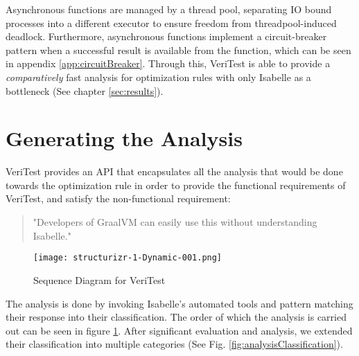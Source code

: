 Asynchronous functions are managed by a thread pool, separating IO bound processes into a different executor to ensure freedom from 
threadpool-induced deadlock. Furthermore, asynchronous functions implement a circuit-breaker pattern when a successful result is available 
from the function, which can be seen in appendix \ref{app:circuitBreaker}. Through this, VeriTest is able to provide a \emph{comparatively} 
fast analysis for optimization rules with only Isabelle as a bottleneck (See chapter \ref{sec:results}).

\section{Generating the Analysis}
\label{sec:generateAnalysis}

VeriTest provides an API that encapsulates all the analysis that would be done towards the optimization rule 
in order to provide the functional requirements of VeriTest, and satisfy the non-functional requirement:

\begin{quote}
    "Developers of GraalVM can easily use this without understanding Isabelle."
\end{quote}

\begin{figure}[!htb]
    \centering
    \texttt{[image: structurizr-1-Dynamic-001.png]}
    \caption{Sequence Diagram for VeriTest}
    \label{fig:sequenceDiagram}
\end{figure}

The analysis is done by invoking Isabelle's automated tools and pattern matching their response into their classification. 
The order of which the analysis is carried out can be seen in figure \ref{fig:sequenceDiagram}. After significant 
evaluation and analysis, we extended their classification into multiple categories (See Fig. \ref{fig:analysisClassification}).

